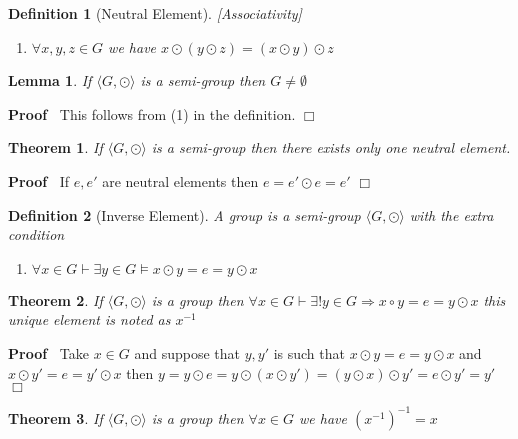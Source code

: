 \documentclass{book}
\newcommand{\um}{-}
\newenvironment{proof}{\noindent\textbf{Proof\ }}{\hspace*{\fill}$\Box$\medskip}
\newtheorem{definition}{Definition}
{\theorembodyfont{\rmfamily}\newtheorem{example}{Example}}
\newtheorem{lemma}{Lemma}
\newtheorem{theorem}{Theorem}
\begin{document}
{{\begin{definition}[Neutral Element][Associativity]
\begin{enumerate}
    \item $\forall x, y, z \in G$ we have $x \odot (y \odot z) = (x \odot y)
    \odot z$
  \end{enumerate}
\end{definition}

\begin{lemma}
  \label{group is not empty}If $\langle G, \odot \rangle$ is a semi-group then
  $G \neq \emptyset$
\end{lemma}

\begin{proof}
  This follows from (1) in the definition.
\end{proof}

\begin{theorem}
  If $\langle G, \odot \rangle$ is a semi-group then there exists only one
  neutral element. 
\end{theorem}

\begin{proof}
  If $e, e'$ are neutral elements then $e = e' \odot e = e'$
\end{proof}

\begin{definition}[Inverse Element]
  {}\label{group}A group is a semi-group $\langle G, \odot
  \rangle$ with the extra condition
  \begin{enumerate}
    \item $\forall x \in G \vdash \exists y \in G \vDash x \odot y = e = y
    \odot x$
  \end{enumerate}
\end{definition}

\begin{theorem}
  If $\langle G, \odot \rangle$ is a group then $\forall x \in G \vdash
  \exists !y \in G \Rightarrow x \circ y = e = y \odot x$ this unique element
  is noted as $x^{\um 1}$
\end{theorem}

\begin{proof}
  Take $x \in G$ and suppose that $y, y'$ is such that $x \odot y = e = y
  \odot x$ and $x \odot y' = e = y' \odot x$ then $y = y \odot e = y \odot (x
  \odot y') = (y \odot x) \odot y' = e \odot y' = y'$
\end{proof}

\begin{theorem}
  \label{inverse of inverse}If $\langle G, \odot \rangle$ is a group then
  $\forall x \in G$ we have $(x^{- 1})^{- 1} = x$
\end{theorem}

}}
\end{document}
